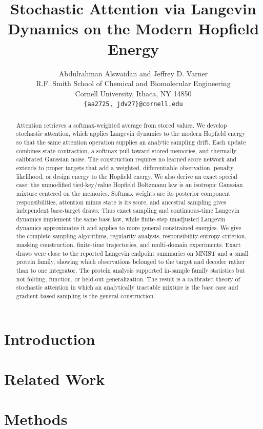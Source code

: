 \documentclass{article}
\title{Stochastic Attention via Langevin Dynamics on the Modern Hopfield Energy}
\author{%
  Abdulrahman Alswaidan and Jeffrey D. Varner \\
  R.F. Smith School of Chemical and Biomolecular Engineering\\
  Cornell University, Ithaca, NY 14850 \\
  \texttt{\{aa2725, jdv27\}@cornell.edu} \\
}
\theoremstyle{definition}
\theoremstyle{remark}
\begin{document}
\maketitle

\begin{abstract}
Attention retrieves a softmax-weighted average from stored values. We develop
stochastic attention, which applies Langevin dynamics to the modern Hopfield
energy so that the same attention operation supplies an analytic sampling
drift. Each update combines state contraction, a softmax pull toward stored
memories, and thermally calibrated Gaussian noise. The construction requires no
learned score network and extends to proper targets that add a weighted,
differentiable observation, penalty, likelihood, or design energy to the
Hopfield energy. We also
derive an exact special case: the unmodified tied-key/value Hopfield Boltzmann
law is an isotropic Gaussian mixture centered on the memories. Softmax weights
are its posterior component responsibilities, attention minus state is its
score, and ancestral sampling gives independent base-target draws. Thus exact
sampling and continuous-time Langevin dynamics implement the same base law,
while finite-step unadjusted Langevin dynamics approximates it and applies to
more general constrained energies. We give the complete sampling algorithms,
regularity analysis, responsibility-entropy criterion, masking construction,
finite-time trajectories, and multi-domain experiments. Exact draws were close
to the reported Langevin endpoint summaries on MNIST and a small protein
family, showing which observations belonged to the target and decoder rather
than to one integrator. The protein analysis supported in-sample family
statistics but not folding, function, or held-out generalization. The result is
a calibrated theory of stochastic attention in which an analytically tractable
mixture is the base case and gradient-based sampling is the general
construction.
\end{abstract}


\section{Introduction}


\section{Related Work}


\section{Methods}


\end{document}
